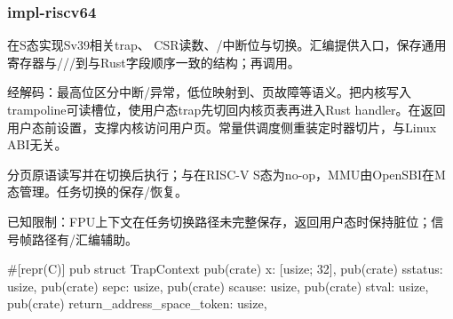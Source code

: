 
\subsubsection{impl-riscv64}

在S态实现Sv39相关trap、 CSR读数、/中断位与切换。汇编提供入口，保存通用寄存器与///到与Rust字段顺序一致的结构；再调用。

经解码：最高位区分中断/异常，低位映射到、页故障等语义。把内核写入trampoline可读槽位，使用户态trap先切回内核页表再进入Rust handler。在返回用户态前设置，支撑内核访问用户页。常量供调度侧重装定时器切片，与Linux ABI无关。

分页原语读写并在切换后执行；与在RISC-V S态为no-op，MMU由OpenSBI在M态管理。任务切换的保存/恢复。

已知限制：FPU上下文在任务切换路径未完整保存，返回用户态时保持脏位；信号帧路径有/汇编辅助。

\begin{rustcode}
#[repr(C)]
pub struct TrapContext {
    pub(crate) x: [usize; 32],
    pub(crate) sstatus: usize,
    pub(crate) sepc: usize,
    pub(crate) scause: usize,
    pub(crate) stval: usize,
    pub(crate) return_address_space_token: usize,
}
\end{rustcode}
